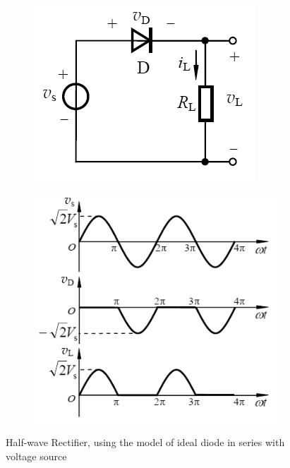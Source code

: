 \begin{figure}[H]
  \centering
  \begin{subfigure}{.5\textwidth}
    \centering
    \includegraphics[width=\linewidth]{figures/Half-Wave-Rect}
  \end{subfigure}
  \begin{subfigure}{.4\textwidth}
    \centering
    \includegraphics[width=\linewidth]{figures/Half-Wave-Rect-diag}
  \end{subfigure}
  \caption{Half-wave Rectifier, using the model of ideal diode in series with voltage source}
\end{figure}

